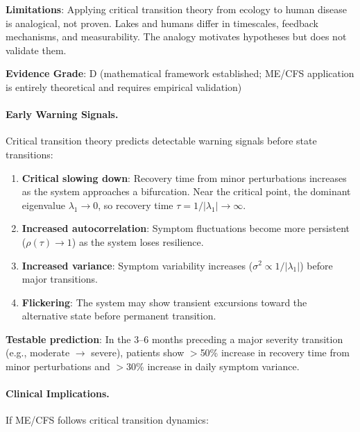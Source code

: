 \begin{hypothesis}
\textbf{Limitations}: Applying critical transition theory from ecology to human disease is analogical, not proven. Lakes and humans differ in timescales, feedback mechanisms, and measurability. The analogy motivates hypotheses but does not validate them.

\textbf{Evidence Grade}: D (mathematical framework established; ME/CFS application is entirely theoretical and requires empirical validation)
\end{hypothesis}

\paragraph{Early Warning Signals.}

Critical transition theory predicts detectable warning signals before state transitions:

\begin{enumerate}
    \item \textbf{Critical slowing down}: Recovery time from minor perturbations increases as the system approaches a bifurcation. Near the critical point, the dominant eigenvalue $\lambda_1 \to 0$, so recovery time $\tau = 1/|\lambda_1| \to \infty$.

    \item \textbf{Increased autocorrelation}: Symptom fluctuations become more persistent ($\rho(\tau) \to 1$) as the system loses resilience.

    \item \textbf{Increased variance}: Symptom variability increases ($\sigma^2 \propto 1/|\lambda_1|$) before major transitions.

    \item \textbf{Flickering}: The system may show transient excursions toward the alternative state before permanent transition.
\end{enumerate}

\textbf{Testable prediction}: In the 3--6 months preceding a major severity transition (e.g., moderate $\to$ severe), patients show $>$50\% increase in recovery time from minor perturbations and $>$30\% increase in daily symptom variance.

\paragraph{Clinical Implications.}

If ME/CFS follows critical transition dynamics:

